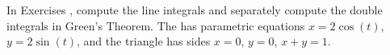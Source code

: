 {\noindent In Exercises} 
{,  compute the line integrals and separately compute the double integrals in Green's Theorem.  The has parametric equations $x=2\cos(t)$, $y=2\sin(t)$, and the triangle has sides $x=0$, $y=0$, $x+y=1$.
}
